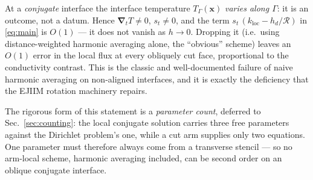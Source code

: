 \documentclass[11pt,a4paper]{article}
\newcommand{\grad}{\boldsymbol{\nabla}}
\newcommand{\Rser}{\mathcal{R}}
\begin{document}
At a \emph{conjugate} interface the interface temperature $T_\Gamma(\boldsymbol{x})$
\emph{varies along $\Gamma$}: it is an outcome, not a datum. Hence
$\grad_tT\neq0$, $s_t\neq0$, and the term
$s_t\,(k_{\text{loc}}-h_d/\Rser)$ in \eqref{eq:main} is $O(1)$ --- it does not
vanish as $h\to0$. Dropping it (i.e.\ using distance-weighted harmonic averaging
alone, the ``obvious'' scheme) leaves an $O(1)$ error in the local flux at every
obliquely cut face, proportional to the conductivity contrast. This is the
classic and well-documented failure of naive harmonic averaging on non-aligned
interfaces, and it is exactly the deficiency that the EJIIM rotation machinery
repairs.

The rigorous form of this statement is a \emph{parameter count}, deferred to
Sec.~\ref{sec:counting}: the local conjugate solution carries three free
parameters against the Dirichlet problem's one, while a cut arm supplies only
two equations. One parameter must therefore always come from a transverse
stencil --- so no arm-local scheme, harmonic averaging included, can be second
order on an oblique conjugate interface.
\end{document}
